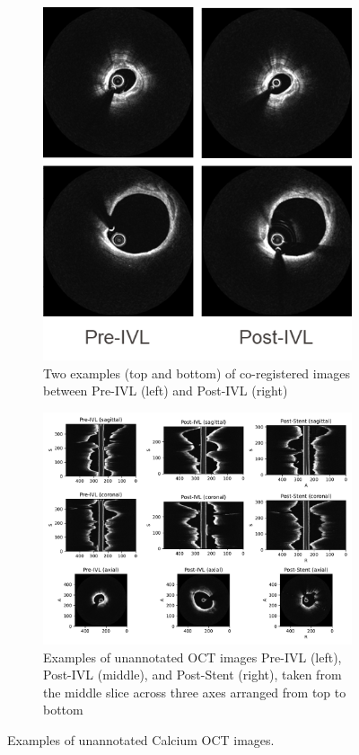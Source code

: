 \documentclass[a4paper,11pt,oneside]{report}
\begin{document}
\begin{figure}[hbt]
    \begin{subfigure}[t]{0.49\textwidth}
        \centering
        \includegraphics[width=0.65\linewidth]{figures/fig_datasets_coregistered_prepostivl.png}
        \caption{Two examples (top and bottom) of co-registered images between Pre-IVL (left) and Post-IVL (right)}
        \label{fig:co-registered-oct}
    \end{subfigure}%
    \hfill
    \begin{subfigure}[t]{0.49\textwidth}
        \centering
        \includegraphics[width=1\linewidth]{figures/fig_datasets_unlabeled_oct_sample.pdf}
        \caption{Examples of unannotated OCT images Pre-IVL (left), Post-IVL (middle), and Post-Stent (right), taken from the middle slice across three axes arranged from top to bottom}
        \label{fig:unannotated-oct}
    \end{subfigure}
    \caption{Examples of unannotated Calcium OCT images.}%
\end{figure}
\end{document}
